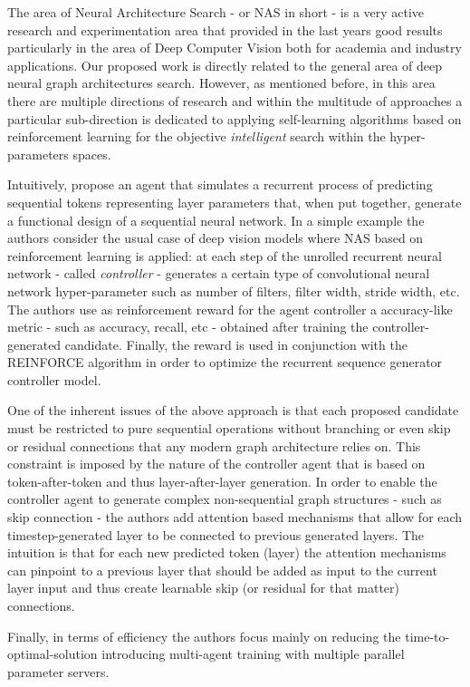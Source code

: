 \documentclass[11pt,a4paper]{article}
\begin{document}
The area of Neural Architecture Search - or NAS in short - is a very active research and experimentation area that provided in the last years  good results particularly in the area of Deep Computer Vision both for academia and industry applications. Our proposed work is directly related to the general area of deep neural graph architectures search. However, as mentioned before, in this area there are multiple directions of research and within the multitude of approaches a particular sub-direction is dedicated to applying self-learning algorithms based on reinforcement learning for the objective \textit{intelligent} search within the hyper-parameters spaces.

Intuitively, \citet{Zoph2017} propose an agent that simulates a recurrent process of predicting sequential tokens representing layer parameters that, when put together, generate a functional design of a sequential neural network. In a simple example the authors consider the usual case of deep vision models where NAS based on reinforcement learning is applied: at each step of the unrolled recurrent neural network - called \textit{controller} - generates a certain type of convolutional neural network hyper-parameter such as number of filters, filter width, stride width, etc. The authors use as reinforcement reward for the agent controller a accuracy-like metric - such as accuracy, recall, etc - obtained after training the controller-generated candidate. Finally, the reward is used in conjunction with the REINFORCE algorithm in order to optimize the recurrent sequence generator controller model. 

One of the inherent issues of the above approach is that each proposed candidate must be restricted to pure sequential operations without branching or even skip or residual connections that any modern graph architecture relies on. This constraint is imposed by the nature of the controller agent that is based on token-after-token and thus layer-after-layer generation. In order to enable the controller agent to generate complex non-sequential graph structures - such as skip connection - the authors add attention based mechanisms that allow for each timestep-generated layer to be connected to previous generated layers. The intuition is that for each new predicted token (layer) the attention mechanisms can pinpoint to a previous layer that should be added as input to the current layer input and thus create learnable skip (or residual for that matter) connections.

Finally, in terms of efficiency the authors focus mainly on reducing the time-to-optimal-solution introducing multi-agent training with multiple parallel parameter servers.
\end{document}
